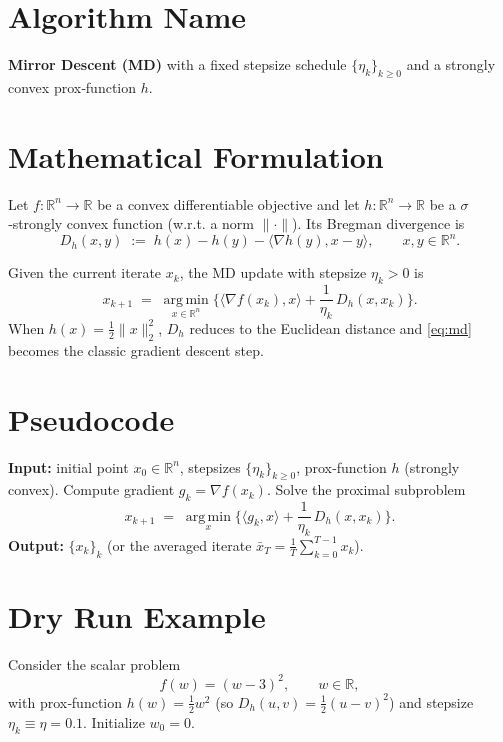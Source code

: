 \documentclass[11pt]{article}
\newcommand{\inner}[2]{\langle #1,#2\rangle}
\newcommand{\argmin}{\operatorname*{arg\,min}}
\newcommand{\grad}{\nabla}
\newcommand{\D}{D}
\newcommand{\R}{\mathbb{R}}
\begin{document}
\section*{Algorithm Name}
\textbf{Mirror Descent (MD)} with a fixed stepsize schedule $\{\eta_k\}_{k\ge 0}$ and a strongly convex prox‑function $h$.

\section*{Mathematical Formulation}
Let $f:\R^{n}\rightarrow\R$ be a convex differentiable objective and let $h:\R^{n}\rightarrow\R$ be a $\sigma$‑strongly convex function (w.r.t. a norm $\|\cdot\|$).  
Its Bregman divergence is
\[
\D_h(x,y)\;:=\;h(x)-h(y)-\inner{\grad h(y)}{x-y},\qquad x,y\in\R^{n}.
\]

Given the current iterate $x_k$, the MD update with stepsize $\eta_k>0$ is
\begin{equation}
\label{eq:md}
x_{k+1}\;=\;\argmin_{x\in\R^{n}}\Big\{ \inner{\grad f(x_k)}{x}+\frac{1}{\eta_k}\,\D_h(x,x_k)\Big\}.
\end{equation}
When $h(x)=\frac12\|x\|_2^{2}$, $\D_h$ reduces to the Euclidean distance and \eqref{eq:md} becomes the classic gradient descent step.

\section*{Pseudocode}
\begin{algorithm}[H]
\caption{Mirror Descent}
\begin{algorithmic}[1]
\STATE \textbf{Input:} initial point $x_0\in\R^{n}$, stepsizes $\{\eta_k\}_{k\ge0}$, prox‑function $h$ (strongly convex).
    \STATE Compute gradient $g_k=\grad f(x_k)$.
    \STATE Solve the proximal subproblem
    \[
        x_{k+1}\;=\;\argmin_{x}\Big\{ \inner{g_k}{x}+\frac{1}{\eta_k}\,\D_h(x,x_k)\Big\}.
    \]
\ENDFOR
\STATE \textbf{Output:} $\{x_k\}_{k}$ (or the averaged iterate $\bar x_T=\frac1T\sum_{k=0}^{T-1}x_k$).
\end{algorithmic}
\end{algorithm}

\section*{Dry Run Example}
Consider the scalar problem 
\[
f(w)=(w-3)^2,\qquad w\in\R,
\]
with prox‑function $h(w)=\frac12 w^{2}$ (so $\D_h(u,v)=\frac12(u-v)^2$) and stepsize $\eta_k\equiv\eta=0.1$.  
Initialize $w_0=0$.
\end{document}
